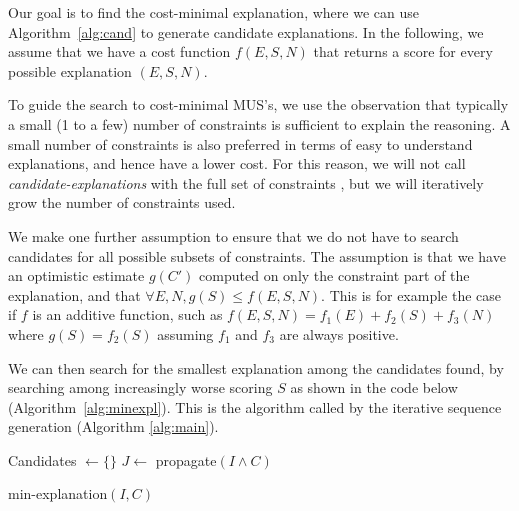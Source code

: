Our goal is to find the cost-minimal explanation, where we can use Algorithm~\ref{alg:cand} to generate candidate explanations. In the following, we assume that we have a cost function $f(E, S, N)$ that returns a score for every possible explanation $(E, S, N)$. 

To guide the search to cost-minimal MUS's, we use the observation that typically a small (1 to a few) number of constraints is sufficient to explain the reasoning. A small number of constraints is also preferred in terms of easy to understand explanations, and hence have a lower cost. For this reason, we will  not call \textit{candidate-explanations} with the full set of constraints \allconstraints, but we will iteratively grow the number of constraints used. 

We make one further assumption to ensure that we do not have to search candidates for all possible subsets of constraints. The assumption is that we have an optimistic estimate $g(C')$ computed on only the constraint part of the explanation, and that $\forall E, N, g(S) \leq f(E, S, N)$. This is for example the case if $f$ is an additive function, such as $f(E, S, N) = f_1(E) + f_2(S) + f_3(N)$ where $g(S) = f_2(S)$ assuming $f_1$ and $f_3$ are always positive.

We can then search for the smallest explanation among the candidates found, by searching among increasingly worse scoring $S$ as shown in the code below (Algorithm~\ref{alg:minexpl}). This is the algorithm called by the iterative sequence generation (Algorithm \ref{alg:main}).

\begin{algorithm}


  Candidates $\gets \{\}$\;
  $J \gets$ propagate$(I \wedge C)$\;
\caption{min-explanation$(I,C)$}
\label{alg:minexpl}
\end{algorithm}

